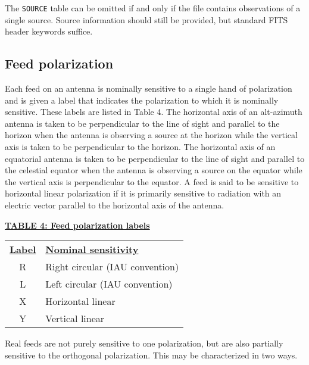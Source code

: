 \documentclass[twoside]{article}
\newcommand{\Hi}[1]{\textcolor{hicol}{#1}}
\begin{document}
\Hi{The {\tt SOURCE} table} can be omitted if and only if the file
contains observations of a single source.  Source information
\Hi{should still be provided, but standard FITS header keywords
suffice.}

\subsection{Feed polarization}
\label{Intr:feedpol}

Each feed on an antenna is nominally sensitive to a single hand of
polarization and is given a label that indicates the polarization to
which it is nominally sensitive.  These labels are listed in Table
\Hi{4}.  The horizontal axis of an alt-azimuth antenna is taken to be
perpendicular to the line of sight and parallel to the horizon when
the antenna is observing a source at the horizon while the vertical
axis is taken to be perpendicular to the horizon.  The horizontal axis
of an equatorial antenna is taken to be perpendicular to the line of
sight and parallel to the celestial equator when the antenna is
observing a source on the equator while the vertical axis is
perpendicular to the equator.  A feed is said to be sensitive to
horizontal linear polarization if it is \Hi{primarily} sensitive to
radiation with an electric vector parallel to the horizontal axis of
the antenna.

\begin{center}
\underline{\bf{TABLE 4: Feed polarization labels}}\\
\begin{tabular}{cl}
\noalign{\vspace{2pt}}
\underline{{\bf Label\vphantom{y}}} & \underline{\bf{Nominal sensitivity}} \\
\noalign{\vspace{2pt}}
 R & Right circular (IAU convention) \\
 L & Left circular (IAU convention) \\
 X & Horizontal linear \\
 Y & Vertical linear
\end{tabular}
\end{center}

Real feeds are not purely sensitive to one polarization, but are also
partially sensitive to the orthogonal polarization.  This may be
characterized in two ways.
\end{document}
